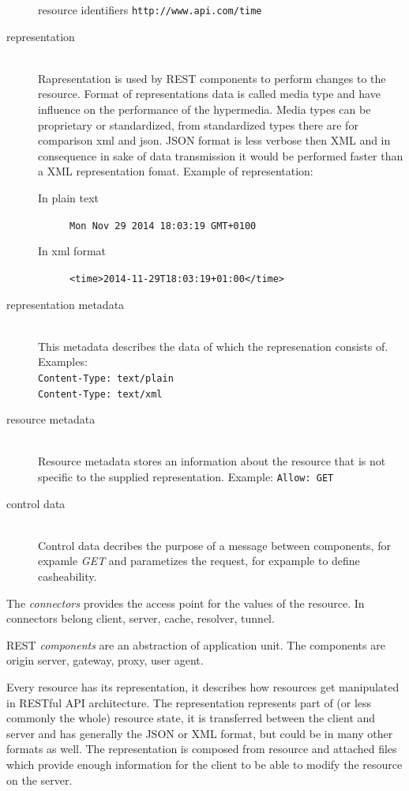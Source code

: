 \begin{description}
 
  resource identifiers 
  \texttt{http://www.api.com/time}
  \item [representation] \hfill \\
  Rapresentation is used by REST components to perform changes to the resource. Format of representations data is called media type and have influence on the performance of the hypermedia. Media types can be proprietary or standardized, from standardized types there are for comparison \gls{xml} and \gls{json}. JSON format is less verbose then XML and in consequence in sake of data transmission it would be performed faster than a XML representation fomat.
  Example of representation:
  \begin{description}
    \item[In plain text] \texttt{Mon Nov 29 2014 18:03:19 GMT+0100}
    \item[In xml format] \texttt{<time>2014-11-29T18:03:19+01:00</time>}
  \end{description}
  \item [representation metadata] \hfill \\
  This metadata describes the data of which the represenation consists of.
  Examples: \hfill \\
  \texttt{Content-Type: text/plain} \hfill \\
  \texttt{Content-Type: text/xml}
   \item [resource metadata] \hfill \\
  Resource metadata stores an information about the resource that is not specific to the supplied representation.
  Example: \texttt{Allow: GET}
  \item [control data] \hfill \\
  Control data decribes the purpose of a message between components, for expamle \emph{GET} and parametizes the request, for expample to define casheability. 
\end{description}

The \emph{connectors} provides the access point for the values of the resource. In connectors belong client, server, cache, resolver, tunnel. %

REST \emph{components} are an abstraction of application unit. The components are origin server, gateway, proxy, user agent. %

\bigskip

Every resource has its representation, it describes how resources get manipulated in RESTful API architecture. The representation represents part of (or less commonly the whole) resource state, it is transferred between the client and server and has generally the JSON or XML format, but could be in many other formats as well. The representation is composed from resource and attached files which provide enough information for the client to be able to modify the resource on the server.

